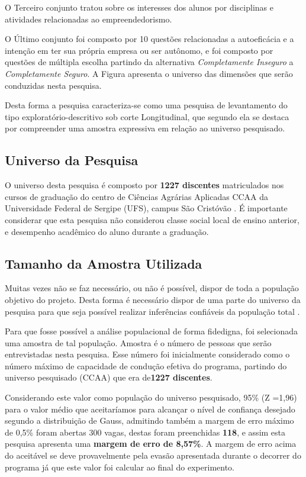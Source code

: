 O Terceiro conjunto tratou sobre os interesses dos alunos por disciplinas e atividades relacionadas ao empreendedorismo.

O Último conjunto foi composto por 10 questões relacionadas a autoeficácia e a intenção em ter sua própria empresa ou ser autônomo, e foi composto por questões de múltipla escolha partindo da alternativa \textit{Completamente Inseguro} a \textit{Completamente Seguro}. A Figura  apresenta o universo das dimensões que serão conduzidas nesta pesquisa.


Desta forma a pesquisa caracteriza-se como uma pesquisa de levantamento do tipo exploratório-descritivo sob corte Longitudinal, que segundo  ela se destaca por compreender uma amostra expressiva em relação ao universo pesquisado.

\subsection{Universo da Pesquisa}

O universo desta pesquisa é composto por \textbf{1227 discentes} matriculados nos cursos de graduação do centro de Ciências Agrárias Aplicadas CCAA da Universidade Federal de Sergipe (UFS), campus São Cristóvão \cite{andrade_ufs_2019}. É importante considerar que esta pesquisa não considerou classe social local de ensino anterior, e desempenho acadêmico do aluno durante a graduação.

\subsection{Tamanho da Amostra Utilizada}

Muitas vezes não se faz necessário, ou não é possível, dispor de toda a população objetivo do projeto. Desta forma é necessário dispor de uma parte do universo da pesquisa para que seja possível realizar inferências confiáveis da população total \cite{marino_manual_2003}.

Para que fosse possível a análise populacional de forma fidedigna, foi selecionada uma amostra de tal população. Amostra é o número de pessoas que serão entrevistadas nesta pesquisa. Esse número foi inicialmente considerado como o número máximo de capacidade de condução efetiva do programa, partindo do universo pesquisado (CCAA) que era de\textbf{1227 discentes}.


Considerando este valor como população do universo pesquisado, 95\% (Z =1,96) para o valor médio que aceitaríamos para alcançar o nível de confiança desejado segundo a distribuição de Gauss, admitindo também a margem de erro máximo de 0,5\% foram abertas 300 vagas, destas foram preenchidas \textbf{118}, e assim esta pesquisa apresenta uma \textbf{margem de erro de 8,57\%}. A margem de erro acima do aceitável se deve provavelmente pela evasão apresentada durante o decorrer do programa já que este valor foi calcular ao final do experimento.



